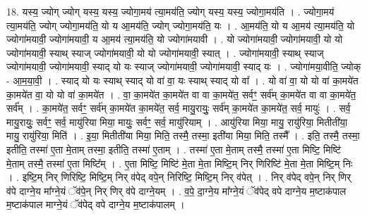 \documentclass[17pt]{extarticle}
\begin{document}
18. यस्य॒ ज्योग् ज्योग् यस्य॒ यस्य॒ ज्योगा॒मय॑ त्या॒मय॑ति॒ ज्योग् यस्य॒ यस्य॒ ज्योगा॒मय॑ति । . ज्योगा॒मय॑ त्या॒मय॑ति॒ ज्योग् ज्योगा॒मय॑ति॒ यो य आ॒मय॑ति॒ ज्योग् ज्योगा॒मय॑ति॒ यः । . आ॒मय॑ति॒ यो य आ॒मय॑ त्या॒मय॑ति॒ यो ज्योगा॑मयावी॒ ज्योगा॑मयावी॒ य आ॒मय॑ त्या॒मय॑ति॒ यो ज्योगा॑मयावी । . यो ज्योगा॑मयावी॒ ज्योगा॑मयावी॒ यो यो ज्योगा॑मयावी॒ स्याथ् स्याज् ज्योगा॑मयावी॒ यो यो ज्योगा॑मयावी॒ स्यात् । . ज्योगा॑मयावी॒ स्याथ् स्याज् ज्योगा॑मयावी॒ ज्योगा॑मयावी॒ स्याद् यो यः स्याज् ज्योगा॑मयावी॒ ज्योगा॑मयावी॒ स्याद् यः । . ज्योगा॑मया॒वीति॒ ज्योक् - आ॒म॒या॒वी॒ । . स्याद् यो यः स्याथ् स्याद् यो वा॑ वा॒ यः स्याथ् स्याद् यो वा᳚ । . यो वा॑ वा॒ यो यो वा॑ का॒मये॑त का॒मये॑त वा॒ यो यो वा॑ का॒मये॑त । . वा॒ का॒मये॑त का॒मये॑त वा वा का॒मये॑त॒ सर्वꣳ॒॒ सर्व॑म् का॒मये॑त वा वा का॒मये॑त॒ सर्व᳚म् । . का॒मये॑त॒ सर्वꣳ॒॒ सर्व॑म् का॒मये॑त का॒मये॑त॒ सर्व॒ मायु॒रायुः॒ सर्व॑म् का॒मये॑त का॒मये॑त॒ सर्व॒ मायुः॑ । . सर्व॒ मायु॒रायुः॒ सर्वꣳ॒॒ सर्व॒ मायु॑रिया मिया॒ मायुः॒ सर्वꣳ॒॒ सर्व॒ मायु॑रियाम् । . आयु॑रिया मिया॒ मायु॒ रायु॑रिया॒ मितीती॑या॒ मायु॒ रायु॑रिया॒ मिति॑ । . इ॒या॒ मितीती॑या मिया॒ मिति॒ तस्मै॒ तस्मा॒ इती॑या मिया॒ मिति॒ तस्मै᳚ । . इति॒ तस्मै॒ तस्मा॒ इतीति॒ तस्मा॑ ए॒ता मे॒ताम् तस्मा॒ इतीति॒ तस्मा॑ ए॒ताम् । . तस्मा॑ ए॒ता मे॒ताम् तस्मै॒ तस्मा॑ ए॒ता मिष्टि॒ मिष्टि॑ मे॒ताम् तस्मै॒ तस्मा॑ ए॒ता मिष्टि᳚म् । . ए॒ता मिष्टि॒ मिष्टि॑ मे॒ता मे॒ता मिष्टि॒म् निर् णिरिष्टि॑ मे॒ता मे॒ता मिष्टि॒म् निः । . इष्टि॒म् निर् णिरिष्टि॒ मिष्टि॒म् निर् व॑पेद् वपे॒न् निरिष्टि॒ मिष्टि॒म् निर् व॑पेत् । . निर् व॑पेद् वपे॒न् निर् णिर् व॑पे दाग्ने॒य मा᳚ग्ने॒यं ॅव॑पे॒न् निर् णिर् व॑पे दाग्ने॒यम् । . व॒पे॒ दा॒ग्ने॒य मा᳚ग्ने॒यं ॅव॑पेद् वपे दाग्ने॒य म॒ष्टाक॑पाल म॒ष्टाक॑पाल माग्ने॒यं ॅव॑पेद् वपे दाग्ने॒य म॒ष्टाक॑पालम् । \newline
\end{document}
